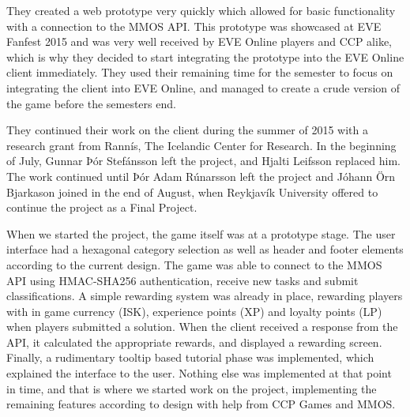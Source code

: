 	They created a web prototype very quickly which allowed for basic functionality with a connection to the MMOS API. This prototype was showcased at EVE Fanfest 2015 and was very well received by EVE Online players and CCP alike, which is why they decided to start integrating the prototype into the EVE Online client immediately. They used their remaining time for the semester to focus on integrating the client into EVE Online, and managed to create a crude version of the game before the semesters end.

	They continued their work on the client during the summer of 2015 with a research grant from Rannís, The Icelandic Center for Research. In the beginning of July, Gunnar Þór Stefánsson left the project, and Hjalti Leifsson replaced him. The work continued until Þór Adam Rúnarsson left the project and Jóhann Örn Bjarkason joined in the end of August, when Reykjavík University offered to continue the project as a Final Project.

	When we started the project, the game itself was at a prototype stage. The user interface had a hexagonal category selection as well as header and footer elements according to the current design. The game was able to connect to the MMOS API using HMAC-SHA256 authentication, receive new tasks and submit classifications. A simple rewarding system was already in place, rewarding players with in game currency (ISK), experience points (XP) and loyalty points (LP) when players submitted a solution. When the client received a response from the API, it calculated the appropriate rewards, and displayed a rewarding screen. Finally, a rudimentary tooltip based tutorial phase was implemented, which explained the interface to the user. Nothing else was implemented at that point in time, and that is where we started work on the project, implementing the remaining features according to design with help from CCP Games and MMOS.

